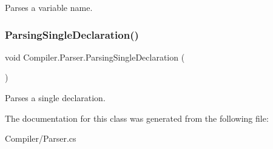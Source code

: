 Parses a variable name. \mbox{\label{class_compiler_1_1_parser_ad0b467a2202c311d465a11165f602216}} 
\subsubsection{\texorpdfstring{Parsing\+Single\+Declaration()}{ParsingSingleDeclaration()}}
{\footnotesize\ttfamily void Compiler.\+Parser.\+Parsing\+Single\+Declaration (\begin{DoxyParamCaption}{ }\end{DoxyParamCaption})\hspace{0.3cm}{\ttfamily [protected]}}

Parses a single declaration. 

The documentation for this class was generated from the following file\+:\begin{DoxyCompactItemize}
\item 
Compiler/Parser.\+cs\end{DoxyCompactItemize}
